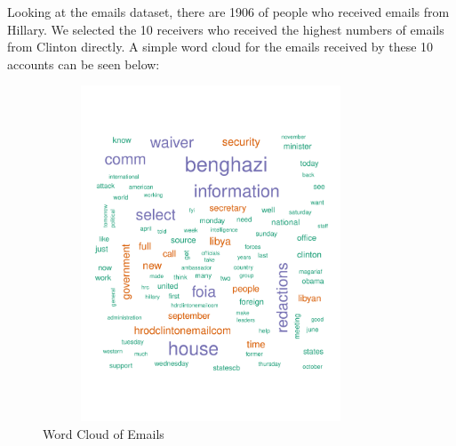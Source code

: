 Looking at the emails dataset, there are 1906 of people who received emails from Hillary. We selected the 10 receivers who received the highest numbers of emails from Clinton directly.
A simple word cloud for the emails received by these 10 accounts can be seen below:

\begin{figure}[h!]
    \centering
    \includegraphics[width=10cm,height=10cm]
    {daitong_and_yihe/wcloud.pdf}
    \caption{Word Cloud of Emails}
\end{figure}

